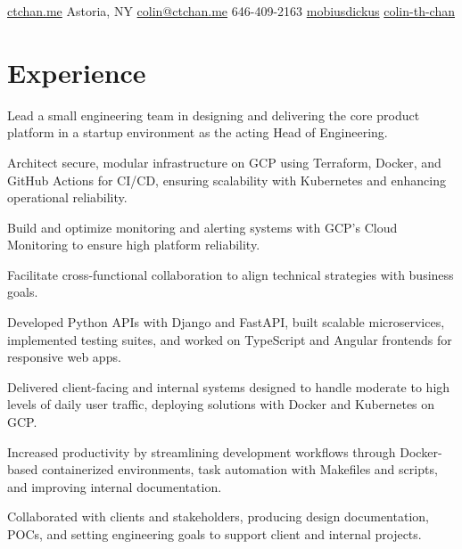\documentclass[]{plushcv}
\begin{document}
%
%
{
  \contactline
  {\href{https://ctchan.me}{ctchan.me}}
  {Astoria, NY}
  {\href{mailto:colin@ctchan.me}{colin@ctchan.me}}
  {646-409-2163}
  {\href{https://www.github.com/mobiusdickus}{mobiusdickus}}
  {\href{https://www.linkedin.com/in/colin-th-chan/}{colin-th-chan}}
}

%
%

\begin{minipage}[t]{0.70\textwidth} 



\section{Experience}
\vspace{\topsep} %
\begin{tightemize}
\sectionsep
\item Lead a small engineering team in designing and delivering the core product platform in a startup environment as the acting Head of Engineering.
\item Architect secure, modular infrastructure on GCP using Terraform, Docker, and GitHub Actions for CI/CD, ensuring scalability with Kubernetes and enhancing operational reliability.
\item Build and optimize monitoring and alerting systems with GCP’s Cloud Monitoring to ensure high platform reliability.
\item Facilitate cross-functional collaboration to align technical strategies with business goals.
\end{tightemize}
\sectionsep

\begin{tightemize}
\sectionsep
\item Developed Python APIs with Django and FastAPI, built scalable microservices, implemented testing suites, and worked on TypeScript and Angular frontends for responsive web apps.
\item Delivered client-facing and internal systems designed to handle moderate to high levels of daily user traffic, deploying solutions with Docker and Kubernetes on GCP.
\item Increased productivity by streamlining development workflows through Docker-based containerized environments, task automation with Makefiles and scripts, and improving internal documentation.
\item Collaborated with clients and stakeholders, producing design documentation, POCs, and setting engineering goals to support client and internal projects.
\end{tightemize}
\sectionsep


\end{minipage}
\end{document}
